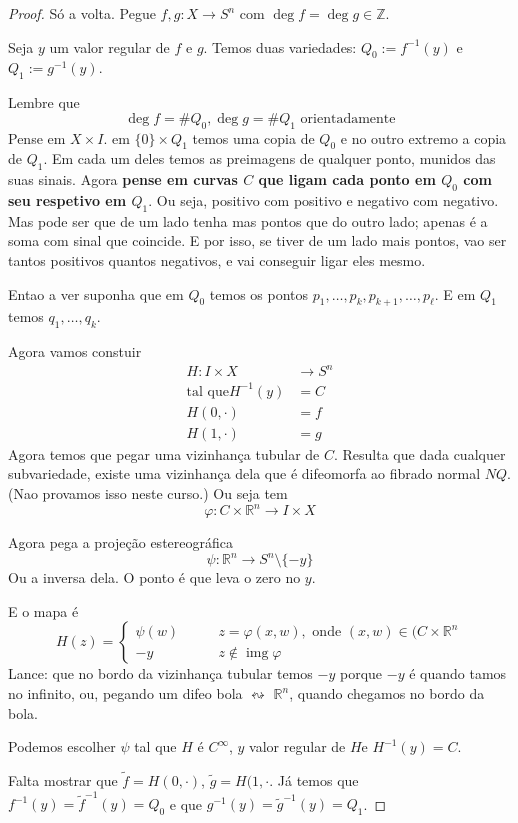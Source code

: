 \begin{proof}\leavevmode
Só a volta. Pegue \(f,g: X \to S^n\) com \(\operatorname{deg}f=\operatorname{deg}g \in \mathbb{Z}\).

Seja \(y \) um valor regular de \(f\) e \(g\). Temos duas variedades: \(Q_0:=f^{-1}(y)\) e \(Q_1:=g^{-1}(y)\).

Lembre que
\[\operatorname{deg}f=\# Q_0, \operatorname{deg}g=\# Q_1\text{ orientadamente} \]
Pense em \(X \times I\). em \(\{0\}\times Q_1\) temos uma copia de \(Q_0\) e no outro extremo a copia de \(Q_1\). Em cada um deles temos as preimagens de qualquer ponto, munidos das suas sinais. Agora \textbf{pense em curvas \(C\) que ligam cada ponto em \(Q_0\) com seu respetivo em \(Q_1\)}. Ou seja, positivo com positivo e negativo com negativo. Mas pode ser que de um lado tenha mas pontos que do outro lado; apenas é a soma com sinal que coincide. E por isso, se tiver de um lado mais pontos, vao ser tantos positivos quantos negativos, e vai conseguir ligar eles mesmo.

Entao a ver suponha que em \(Q_0\) temos os pontos \(p_1,\ldots,p_k, p_{k+1},\ldots,p_\ell\). E em \(Q_1\) temos \(q_1,\ldots,q_k\).

Agora vamos constuir
\begin{align*}
	H: I \times X &\longrightarrow S^n \\
	\text{tal que}  H^{-1}(y)&=C\\
	H(0,\cdot )&=f\\
	H(1,\cdot )&=g
\end{align*}
Agora temos que pegar uma vizinhança tubular de \(C\). Resulta que dada cualquer subvariedade, existe uma vizinhança dela que é difeomorfa ao fibrado normal \(NQ\). (Nao provamos isso neste curso.) Ou seja tem
\[\varphi: C \times \mathbb{R}^n \longrightarrow I \times X\]

Agora pega a projeção estereográfica
\[\psi: \mathbb{R}^n \longrightarrow S^n\setminus \{-y\}\]
Ou a inversa dela. O ponto é que leva o zero no \(y\).

E o mapa é
\[H(z)=\begin{cases}
	\psi(w)\qquad &z = \varphi(x,w),\text{ onde } (x,w) \in (C \times \mathbb{R}^n \\
	-y\qquad &z \not \in \operatorname{img} \varphi
\end{cases}\]
{\color{2}Lance:} que no bordo da vizinhança tubular temos \(-y\) porque  \(-y\) é quando tamos no infinito, ou, pegando um difeo bola  \(\leftrightsquigarrow\) \(\mathbb{R}^n\), quando chegamos no bordo da bola.
\begin{exercise}\leavevmode
	Podemos escolher \(\psi\) tal que \(H\) é \(C^\infty\), \(y\) valor regular de \(H\)e  \(H^{-1}(y)=C\).
\end{exercise}
Falta mostrar que \(\tilde{f}=H(0,\cdot )\), \(\tilde{g}=H(1,\cdot \). Já temos que \(f^{-1}(y)=\tilde{f}^{-1}(y)=Q_0\) e que \(g^{-1}(y)=\tilde{g}^{-1}(y)=Q_1\).


\end{proof}
